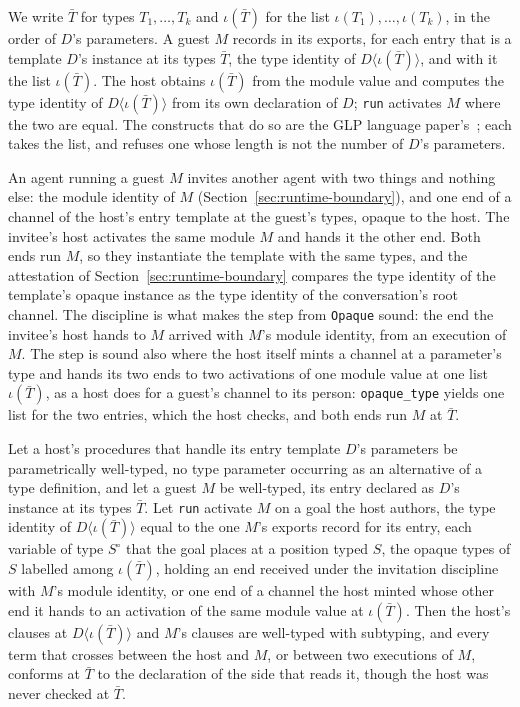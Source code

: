 We write $\bar T$ for types $T_1, \ldots, T_k$ and $\iota(\bar T)$ for the list $\iota(T_1), \ldots, \iota(T_k)$, in the order of $D$'s parameters.  A guest $M$ records in its exports, for each entry that is a template $D$'s instance at its types $\bar T$, the type identity of $D\langle\iota(\bar T)\rangle$, and with it the list $\iota(\bar T)$.  The host obtains $\iota(\bar T)$ from the module value and computes the type identity of $D\langle\iota(\bar T)\rangle$ from its own declaration of $D$; \verb|run| activates $M$ where the two are equal.  The constructs that do so are the GLP language paper's~\cite{shapiro2025glp}; each takes the list, and refuses one whose length is not the number of $D$'s parameters.

An agent running a guest $M$ invites another agent with two things and nothing else: the module identity of $M$ (Section~\ref{sec:runtime-boundary}), and one end of a channel of the host's entry template at the guest's types, opaque to the host.  The invitee's host activates the same module $M$ and hands it the other end.  Both ends run $M$, so they instantiate the template with the same types, and the attestation of Section~\ref{sec:runtime-boundary} compares the type identity of the template's opaque instance as the type identity of the conversation's root channel.  The discipline is what makes the step from \verb|Opaque| sound: the end the invitee's host hands to $M$ arrived with $M$'s module identity, from an execution of $M$.  The step is sound also where the host itself mints a channel at a parameter's type and hands its two ends to two activations of one module value at one list $\iota(\bar T)$, as a host does for a guest's channel to its person: \verb|opaque_type| yields one list for the two entries, which the host checks, and both ends run $M$ at $\bar T$.

\begin{proposition}
\label{prop:opaque-activation}
Let a host's procedures that handle its entry template $D$'s parameters be parametrically well-typed, no type parameter occurring as an alternative of a type definition, and let a guest $M$ be well-typed, its entry declared as $D$'s instance at its types $\bar T$.  Let \verb|run| activate $M$ on a goal the host authors, the type identity of $D\langle\iota(\bar T)\rangle$ equal to the one $M$'s exports record for its entry, each variable of type $S^\circ$ that the goal places at a position typed $S$, the opaque types of $S$ labelled among $\iota(\bar T)$, holding an end received under the invitation discipline with $M$'s module identity, or one end of a channel the host minted whose other end it hands to an activation of the same module value at $\iota(\bar T)$.  Then the host's clauses at $D\langle\iota(\bar T)\rangle$ and $M$'s clauses are well-typed with subtyping, and every term that crosses between the host and $M$, or between two executions of $M$, conforms at $\bar T$ to the declaration of the side that reads it, though the host was never checked at $\bar T$.
\end{proposition}

